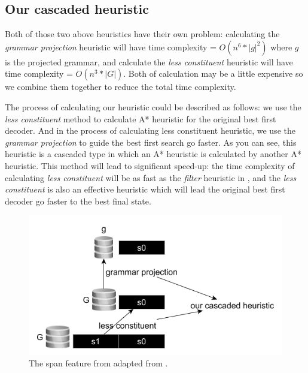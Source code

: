 \subsection{Our cascaded heuristic}
Both of those two above heuristics have their own problem: calculating the \textit{grammar projection} heuristic will have time complexity = $O(n^6*|g|^2)$ where $g$ is the projected grammar, and calculate the \textit{less constituent} heuristic will have time complexity = $O(n^3*|G|)$. Both of calculation may be a little expensive so we combine them together to reduce the total time complexity. 

The process of calculating our heuristic could be described as follows: we use the \textit{less constituent} method to calculate A* heuristic for the original best first decoder. And in the process of calculating less constituent heuristic, we use the \textit{grammar projection} to guide the best first search go faster. As you can see, this heuristic is a cascaded type in which an A* heuristic is calculated by another A* heuristic. This method will lead to significant speed-up: the time complexity of calculating \textit{less constituent} will be as fast as the \textit{filter} heuristic in \cite{ref:2003Dan1}, and the \textit{less constituent} is also an effective heuristic which will lead the original best first decoder go faster to the best final state.

\begin{figure}[t]
	\centering
	\includegraphics[width=0.5 \textwidth]{cascadedAstar.png}
	\caption{\label{spanFeature}The span feature from adapted from \cite{ref:2014David}.}
\end{figure}